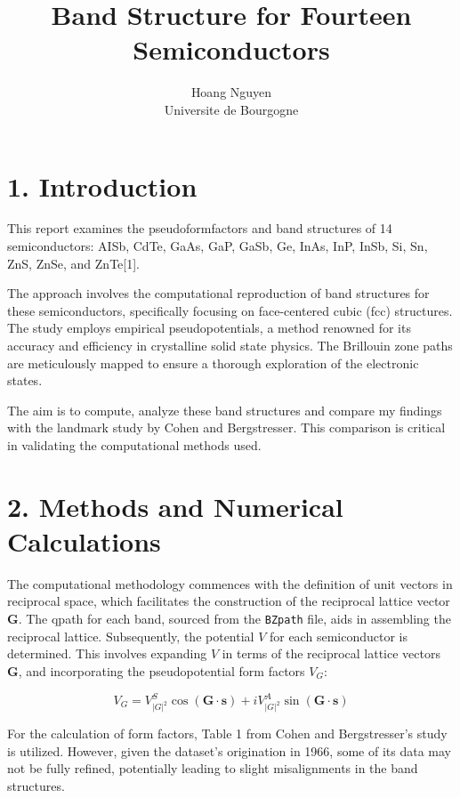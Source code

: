 \documentclass[twocolumn]{article}[h]
\title{Band Structure for Fourteen Semiconductors}
\author{Hoang Nguyen\\
  Universite de Bourgogne\\
}
\begin{document}
\maketitle

\section*{1. Introduction}

This report examines the pseudoformfactors and band structures of 14 semiconductors: AISb, CdTe, GaAs, GaP, GaSb, Ge, InAs, InP, InSb, Si, Sn, ZnS, ZnSe, and ZnTe[1].

The approach involves the computational reproduction of band structures for these semiconductors, specifically focusing on face-centered cubic (fcc) structures. The study employs empirical pseudopotentials, a method renowned for its accuracy and efficiency in crystalline solid state physics. The Brillouin zone paths are meticulously mapped to ensure a thorough exploration of the electronic states.

The aim is to compute, analyze these band structures and compare my findings with the landmark study by Cohen and Bergstresser. This comparison is critical in validating the computational methods used.

\section*{2. Methods and Numerical Calculations}

The computational methodology commences with the definition of unit vectors in reciprocal space, which facilitates the construction of the reciprocal lattice vector \( \mathbf{G} \). The qpath for each band, sourced from the \texttt{BZpath} file, aids in assembling the reciprocal lattice. Subsequently, the potential \( V \) for each semiconductor is determined. This involves expanding \( V \) in terms of the reciprocal lattice vectors \( \mathbf{G} \), and incorporating the pseudopotential form factors \( V_G \):

\begin{equation}
    V_G = V^{S}_{|G|^2} \cos(\mathbf{G} \cdot \mathbf{s}) + iV^{A}_{|G|^2} \sin(\mathbf{G} \cdot \mathbf{s})
\end{equation}

For the calculation of form factors, Table 1 from Cohen and Bergstresser's study is utilized. However, given the dataset's origination in 1966, some of its data may not be fully refined, potentially leading to slight misalignments in the band structures.
\end{document}

